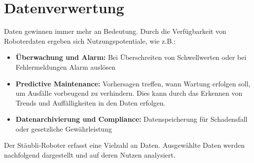 \documentclass[ a4paper,
                oneside,
                toc=bibliography,
                toc=listof
                ]{scrbook}
\begin{document}
	\section{Datenverwertung}
	Daten gewinnen immer mehr an Bedeutung. Durch die Verfügbarkeit von Roboterdaten ergeben sich Nutzungspotentiale, wie z.B.:
	\begin{itemize}
		\item \textbf{Überwachung und Alarm:} Bei Überschreiten von Schwellwerten oder bei Fehlermeldungen Alarm auslösen
		\item \textbf{Predictive Maintenance:} Vorhersagen treffen, wann Wartung erfolgen soll, um Ausfälle vorbeugend zu verhindern. Dies kann durch das Erkennen von Trends und Auffälligkeiten in den Daten erfolgen.
		\item \textbf{Datenarchivierung und Compliance:} Datenspeicherung für Schadensfall oder gesetzliche Gewährleistung
	\end{itemize}
	Der Stäubli-Roboter erfasst eine Vielzahl an Daten. Ausgewählte Daten werden nachfolgend dargestellt und auf deren Nutzen analysiert.
\end{document}
